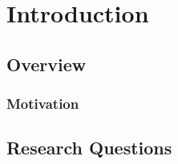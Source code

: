 \chapter{Introduction}


\section{Overview}

\subsection{Motivation}
\label{sec:intro_overview}

\section{Research Questions}
\label{sec:intro_questions}
